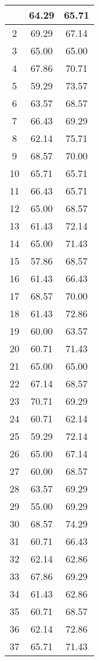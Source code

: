 \documentclass[11pt]{article}
\begin{document}
\begin{longtable}[c]{| c | c |c |}
 \hline
 \hline\hline
 \endlastfoot
1 & 64.29 & 65.71 \\ \hline
2 & 69.29 & 67.14 \\ \hline
3 & 65.00 & 65.00 \\ \hline
4 & 67.86 & 70.71 \\ \hline
5 & 59.29 & 73.57 \\ \hline
6 & 63.57 & 68.57 \\ \hline
7 & 66.43 & 69.29 \\ \hline
8 & 62.14 & 75.71 \\ \hline
9 & 68.57 & 70.00 \\ \hline
10 & 65.71 & 65.71 \\ \hline
11 & 66.43 & 65.71 \\ \hline
12 & 65.00 & 68.57 \\ \hline
13 & 61.43 & 72.14 \\ \hline
14 & 65.00 & 71.43 \\ \hline
15 & 57.86 & 68.57 \\ \hline
16 & 61.43 & 66.43 \\ \hline
17 & 68.57 & 70.00 \\ \hline
18 & 61.43 & 72.86 \\ \hline
19 & 60.00 & 63.57 \\ \hline
20 & 60.71 & 71.43 \\ \hline
21 & 65.00 & 65.00 \\ \hline
22 & 67.14 & 68.57 \\ \hline
23 & 70.71 & 69.29 \\ \hline
24 & 60.71 & 62.14 \\ \hline
25 & 59.29 & 72.14 \\ \hline
26 & 65.00 & 67.14 \\ \hline
27 & 60.00 & 68.57 \\ \hline
28 & 63.57 & 69.29 \\ \hline
29 & 55.00 & 69.29 \\ \hline
30 & 68.57 & 74.29 \\ \hline
31 & 60.71 & 66.43 \\ \hline
32 & 62.14 & 62.86 \\ \hline
33 & 67.86 & 69.29 \\ \hline
34 & 61.43 & 62.86 \\ \hline
35 & 60.71 & 68.57 \\ \hline
36 & 62.14 & 72.86 \\ \hline
37 & 65.71 & 71.43 \\ \hline

\end{longtable}
\end{document}
